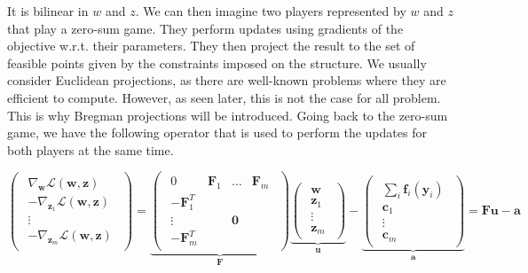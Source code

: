 \documentclass{article}
\renewcommand{\vec}{\mathbf}
\begin{document}
It is bilinear in $w$ and $z$. We can then imagine two players represented by $w$ and $z$ that play a zero-sum game. They perform updates using gradients of the objective w.r.t. their parameters. They then project the result to the set of feasible points given by the constraints imposed on the structure. We usually consider Euclidean projections, as there are well-known problems where they are efficient to compute. However, as seen later, this is not the case for all problem. This is why Bregman projections will be introduced. Going back to the zero-sum game, we have the following operator that is used to perform the updates for both players at the same time. 

\begin{equation}
  \begin{pmatrix}
    \begin{array}{c}
      \nabla_{\vec w} \mathcal{L}(\vec w,\vec z)\\
      -\nabla_{\vec z_1} \mathcal{L}(\vec w,\vec z)\\
      \vdots\\
      -\nabla_{\vec z_m} \mathcal{L}(\vec w,\vec z)
    \end{array}
  \end{pmatrix} =
  \underbrace{
    \begin{pmatrix}
      \begin{array}{cccc}
        0 & \vec F_1 & \dots & \vec F_m\\
        -\vec F_1^T & & &\\
        \vdots & & \vec 0 &\\
        -\vec F_m^T & & &
      \end{array}
    \end{pmatrix}}_{\vec F}
  \underbrace{
    \begin{pmatrix}
      \begin{array}{c}
        \vec w\\
        \vec z_1\\
        \vdots\\
        \vec z_m
      \end{array}
    \end{pmatrix}}_{\vec u}-
  \underbrace{
    \begin{pmatrix}
      \begin{array}{c}
        \sum_i \vec f_i(\vec y_i)\\
        \vec c_1\\
        \vdots\\
        \vec c_m
      \end{array}
    \end{pmatrix}}_{\vec a} = \vec F \vec u - \vec a
\end{equation}
\end{document}

